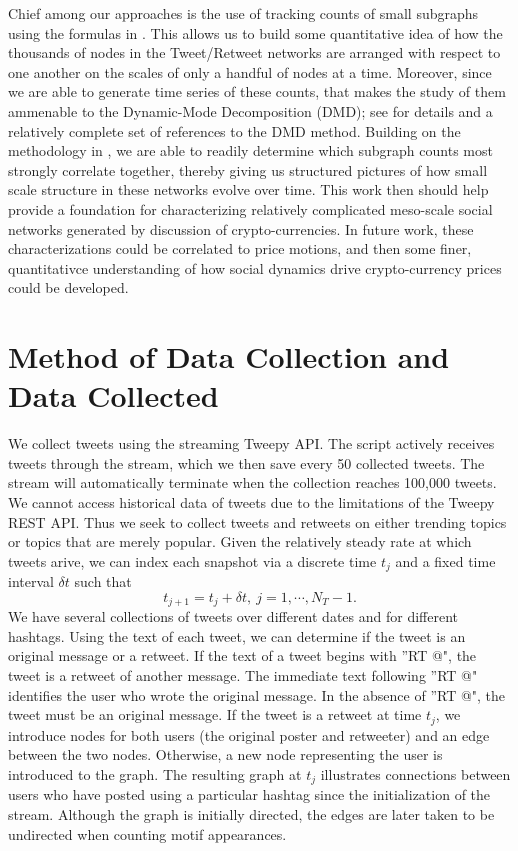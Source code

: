 \documentclass[a4paper,11pt]{article}
\begin{document}
Chief among our approaches is the use of tracking counts of small subgraphs using the formulas in \cite{alon}.  This allows us to build some quantitative idea of how the thousands of nodes in the Tweet/Retweet networks are arranged with respect to one another on the scales of only a handful of nodes at a time.  Moreover, since we are able to generate time series of these counts, that makes the study of them ammenable to the Dynamic-Mode Decomposition (DMD); see \cite{kutz} for details and a relatively complete set of references to the DMD method.  Building on the methodology in \cite{curtis2021detection}, we are able to readily determine which subgraph counts most strongly correlate together, thereby giving us structured pictures of how small scale structure in these networks evolve over time.  This work then should help provide a foundation for characterizing relatively complicated meso-scale social networks generated by discussion of crypto-currencies.  In future work, these characterizations could be correlated to price motions, and then some finer, quantitativce understanding of how social dynamics drive crypto-currency prices could be developed.  
\section{Method of Data Collection and Data Collected}
We collect tweets using the streaming Tweepy API. The script actively receives tweets through the stream, which we then save every 50 collected tweets. The stream will automatically terminate when the collection reaches 100,000 tweets. We cannot access historical data of tweets due to the limitations of the Tweepy REST API. Thus we seek to collect tweets and retweets on either trending topics or topics that are merely popular.  Given the relatively steady rate at which tweets arive, we can index each snapshot via a discrete time $t_{j}$ and a fixed time interval $\delta t$ such that 
\[
t_{j+1} = t_{j} + \delta t, ~ j=1,\cdots, N_{T}-1.
\]
We have several collections of tweets over different dates and for different hashtags. Using the text of each tweet, we can determine if the tweet is an original message or a retweet. If the 
text of a tweet begins with ''RT @", the tweet is a retweet of another message. The immediate text following ''RT @" identifies the user who wrote the original message. In the absence of ''RT @", the
tweet must be an original message. If the tweet is a retweet at time $t_j$, we introduce nodes for both users (the original poster and retweeter) and an edge between the two nodes.
 Otherwise, a new node representing the user is introduced to the graph. The resulting graph at $t_j$ illustrates connections between users who have posted using a particular
hashtag since the initialization of the stream. Although the graph is initially directed, the edges are later taken to be undirected when counting motif appearances. 
\end{document}

